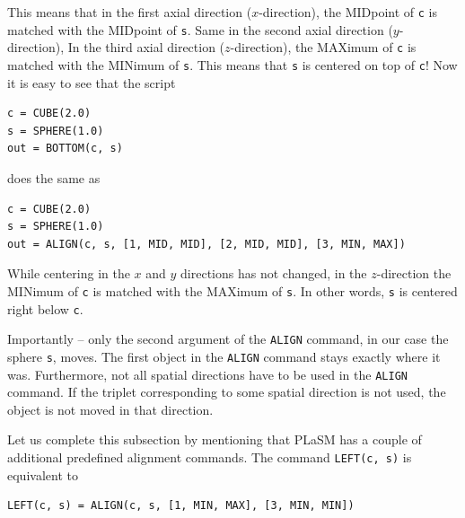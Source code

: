 \noindent
This means that in the first axial direction ($x$-direction), the MIDpoint of {\tt c} is matched 
with the MIDpoint of {\tt s}. Same in the second axial direction ($y$-direction), In the 
third axial direction ($z$-direction), the MAXimum of {\tt c} is matched with the MINimum of {\tt s}.
This means that {\tt s} is centered on top of {\tt c}! Now it is easy to see that the 
script \\

\begin{bbox}
\begin{verbatim}
c = CUBE(2.0)
s = SPHERE(1.0)
out = BOTTOM(c, s)
\end{verbatim}
\end{bbox}
\vspace{6mm}

\noindent
does the same as \\

\begin{bbox}
\begin{verbatim}
c = CUBE(2.0)
s = SPHERE(1.0)
out = ALIGN(c, s, [1, MID, MID], [2, MID, MID], [3, MIN, MAX])
\end{verbatim}
\end{bbox}
\vspace{6mm}

\noindent
While centering in the $x$ and $y$ directions has not changed, in the $z$-direction 
the MINimum of {\tt c} is matched with the MAXimum of {\tt s}. In other words,
{\tt s} is centered right below {\tt c}. 

Importantly -- only the second argument of the {\tt ALIGN} command, in our case the sphere {\tt s}, moves. The first 
object in the {\tt ALIGN} command stays exactly where it was. Furthermore, not all spatial directions 
have to be used in the {\tt ALIGN} command. If the triplet corresponding to some spatial direction 
is not used, the object is not moved in that direction. 

Let us complete this subsection by mentioning that PLaSM has a couple of additional
predefined alignment commands. The command {\tt LEFT(c, s)} is equivalent to\\

\begin{bbox}
\begin{verbatim}
LEFT(c, s) = ALIGN(c, s, [1, MIN, MAX], [3, MIN, MIN])
\end{verbatim}
\end{bbox}
\vspace{6mm}

